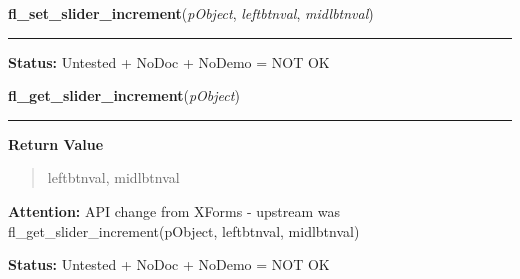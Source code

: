     \label{xformslib:library:fl_set_slider_increment}

    \vspace{0.5ex}

\hspace{.8\funcindent}\begin{boxedminipage}{\funcwidth}

    \raggedright \textbf{fl\_set\_slider\_increment}(\textit{pObject}, \textit{leftbtnval}, \textit{midlbtnval})

    \vspace{-1.5ex}

    \rule{\textwidth}{0.5\fboxrule}
\setlength{\parskip}{2ex}
\setlength{\parskip}{1ex}
\textbf{Status:} Untested + NoDoc + NoDemo = NOT OK



    \end{boxedminipage}

    \label{xformslib:library:fl_get_slider_increment}

    \vspace{0.5ex}

\hspace{.8\funcindent}\begin{boxedminipage}{\funcwidth}

    \raggedright \textbf{fl\_get\_slider\_increment}(\textit{pObject})

    \vspace{-1.5ex}

    \rule{\textwidth}{0.5\fboxrule}
\setlength{\parskip}{2ex}
\setlength{\parskip}{1ex}
      \textbf{Return Value}
    \vspace{-1ex}

      \begin{quote}
      leftbtnval, midlbtnval

      \end{quote}

\textbf{Attention:} API change from XForms - upstream was fl\_get\_slider\_increment(pObject, 
leftbtnval, midlbtnval)



\textbf{Status:} Untested + NoDoc + NoDemo = NOT OK



    \end{boxedminipage}

